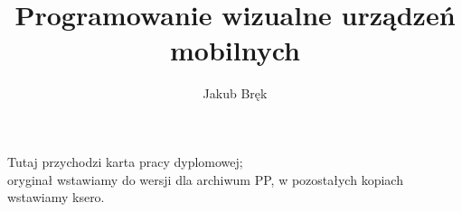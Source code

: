 \documentclass[polish,a4paper,twoside]{ppfcmthesis}
\author{Jakub Bręk}                              %
\title{Programowanie wizualne urządzeń mobilnych}        %
\begin{document}
\frontmatter\pagestyle{empty}%
\maketitle\cleardoublepage%

\pagebreak

\thispagestyle{empty}\vspace*{\fill}%
\begin{center}Tutaj przychodzi karta pracy dyplomowej;\\oryginał wstawiamy do wersji dla archiwum PP, w pozostałych kopiach wstawiamy ksero.\end{center}%
\vfill\cleardoublepage%

\pagebreak

\pagestyle{ppfcmthesis}%
\tableofcontents* \cleardoublepage%

\mainmatter%








\cleardoublepage\appendix%


{\raggedright\sloppy\small}

\ppcolophon
\end{document}
